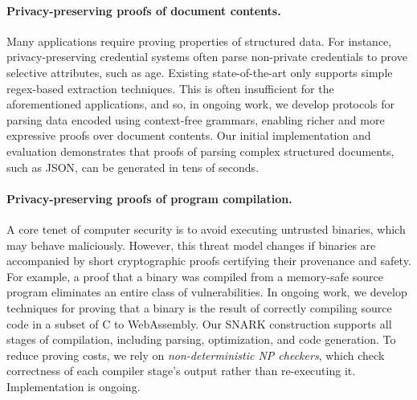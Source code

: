 \documentclass[11pt,letterpaper]{article}
\theoremstyle{definition} %
\theoremstyle{remark} %
\begin{document}
\paragraph{Privacy-preserving proofs of document contents.}
Many applications require proving properties of structured data. 
For instance, privacy-preserving credential systems often parse non-private credentials to prove selective attributes, such as age. 
Existing state-of-the-art \cite{AngelIMSW24} only supports simple regex-based extraction techniques. This is often insufficient for the aforementioned applications, and so, in ongoing work, we develop protocols for parsing data encoded using context-free grammars, enabling richer and more expressive proofs over document contents. 
Our initial implementation and evaluation demonstrates that proofs of parsing complex structured documents, such as JSON, can be generated in tens of seconds.

\paragraph{Privacy-preserving proofs of program compilation.}
A core tenet of computer security is to avoid executing untrusted binaries, which may behave maliciously. 
However, this threat model changes if binaries are accompanied by short cryptographic proofs certifying their provenance and safety. 
For example, a proof that a binary was compiled from a memory-safe source program eliminates an entire class of vulnerabilities. 
In ongoing work, we develop techniques for proving that a binary is the result of correctly compiling source code in a subset of C to WebAssembly. 
Our SNARK construction supports all stages of compilation, including parsing, optimization, and code generation. 
To reduce proving costs, we rely on \emph{non-deterministic NP checkers}, which check correctness of each compiler stage's output rather than re-executing it. Implementation is ongoing.


\end{document}
